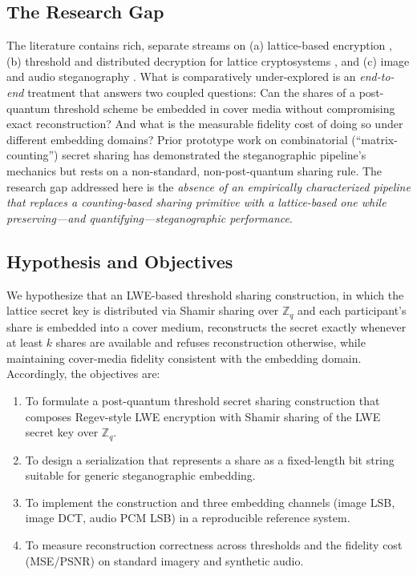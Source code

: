 \documentclass[runningheads]{llncs}
\begin{document}
\subsection{The Research Gap}

The literature contains rich, separate streams on (a) lattice-based encryption
\cite{regev2005,gentry2008}, (b) threshold and distributed decryption for
lattice cryptosystems \cite{bendlin2010,desmedt1994,gemmell1997}, and (c)
image and audio steganography
\cite{chan2004,westfeld2001,johnson1998,petitcolas1999}. What is
comparatively under-explored is an \emph{end-to-end} treatment that answers two
coupled questions: Can the shares of a post-quantum threshold scheme be
embedded in cover media without compromising exact reconstruction? And what is
the measurable fidelity cost of doing so under different embedding domains?
Prior prototype work on combinatorial (``matrix-counting'') secret sharing has
demonstrated the steganographic pipeline's mechanics but rests on a
non-standard, non-post-quantum sharing rule. The research gap addressed here is
the \emph{absence of an empirically characterized pipeline that replaces a
counting-based sharing primitive with a lattice-based one while
preserving---and quantifying---steganographic performance}.

\subsection{Hypothesis and Objectives}

We hypothesize that an LWE-based threshold sharing construction, in which the
lattice secret key is distributed via Shamir sharing over $\mathbb{Z}_q$ and
each participant's share is embedded into a cover medium, reconstructs the
secret exactly whenever at least $k$ shares are available and refuses
reconstruction otherwise, while maintaining cover-media fidelity consistent
with the embedding domain. Accordingly, the objectives are:

\begin{enumerate}
  \item To formulate a post-quantum threshold secret sharing construction that
        composes Regev-style LWE encryption with Shamir sharing of the LWE
        secret key over $\mathbb{Z}_q$.
  \item To design a serialization that represents a share as a fixed-length bit
        string suitable for generic steganographic embedding.
  \item To implement the construction and three embedding channels (image LSB,
        image DCT, audio PCM LSB) in a reproducible reference system.
  \item To measure reconstruction correctness across thresholds and the
        fidelity cost (MSE/PSNR) on standard imagery and synthetic audio.
\end{enumerate}
\end{document}

